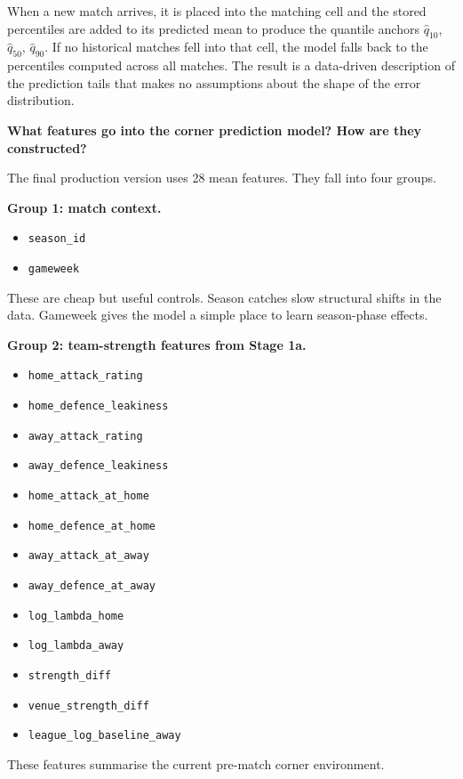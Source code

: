 \documentclass{article}
\begin{document}
When a new match arrives, it is placed into the matching cell and the stored percentiles are added to its predicted mean to produce the quantile anchors \(\hat{q}_{10}\), \(\hat{q}_{50}\), \(\hat{q}_{90}\).
If no historical matches fell into that cell, the model falls back to the percentiles computed across all matches.
The result is a data-driven description of the prediction tails that makes no assumptions about the shape of the error distribution.

\bigskip

\noindent \textbf{What features go into the corner prediction model? How are they constructed?}

\noindent The final production version uses 28 mean features. They fall into four groups.

\textbf{Group 1: match context.}
\begin{itemize}
    \item \texttt{season\_id}
    \item \texttt{gameweek}
\end{itemize}
These are cheap but useful controls. Season catches slow structural shifts in the data. Gameweek gives the model a simple place to learn season-phase effects.

\textbf{Group 2: team-strength features from Stage 1a.}
\begin{itemize}
    \item \texttt{home\_attack\_rating}
    \item \texttt{home\_defence\_leakiness}
    \item \texttt{away\_attack\_rating}
    \item \texttt{away\_defence\_leakiness}
    \item \texttt{home\_attack\_at\_home}
    \item \texttt{home\_defence\_at\_home}
    \item \texttt{away\_attack\_at\_away}
    \item \texttt{away\_defence\_at\_away}
    \item \texttt{log\_lambda\_home}
    \item \texttt{log\_lambda\_away}
    \item \texttt{strength\_diff}
    \item \texttt{venue\_strength\_diff}
    \item \texttt{league\_log\_baseline\_away}
\end{itemize}
These features summarise the current pre-match corner environment.
\end{document}
